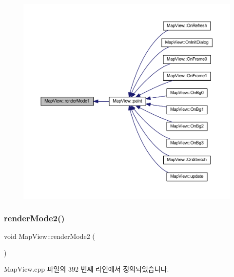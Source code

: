 \begin{figure}[H]
\begin{center}
\leavevmode
\includegraphics[width=350pt]{class_map_view_afcc44b85ee5727fc507a34672a3b6ce4_icgraph}
\end{center}
\end{figure}
\mbox{\label{class_map_view_a4c9cc923e9b7112cfc15887fdec4284d}} 
\subsubsection{\texorpdfstring{render\+Mode2()}{renderMode2()}}
{\footnotesize\ttfamily void Map\+View\+::render\+Mode2 (\begin{DoxyParamCaption}{ }\end{DoxyParamCaption})}



Map\+View.\+cpp 파일의 392 번째 라인에서 정의되었습니다.


